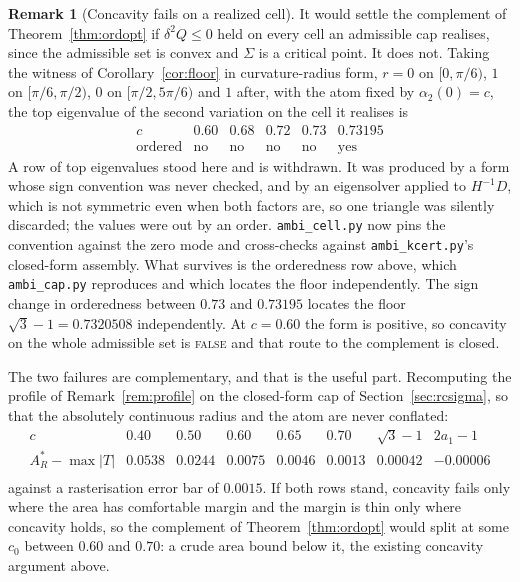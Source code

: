 \documentclass[11pt]{article}
\theoremstyle{definition}
\newtheorem{remark}[theorem]{Remark}
\newcommand{\Sig}{\Sigma}
\begin{document}
\begin{remark}[Concavity fails on a realized cell]\label{rem:concfail}
It would settle the complement of Theorem~\ref{thm:ordopt} if $\delta^2Q\le0$ held on every
cell an admissible cap realises, since the admissible set is convex and $\Sig$ is a critical
point. It does not. Taking the witness of Corollary~\ref{cor:floor} in curvature-radius
form, $r=0$ on $[0,\pi/6)$, $1$ on $[\pi/6,\pi/2)$, $0$ on $[\pi/2,5\pi/6)$ and $1$ after,
with the atom fixed by $\alpha_2(0)=c$, the top eigenvalue of the second variation on the
cell it realises is
\[
  \begin{array}{r|ccccc}
    c & 0.60 & 0.68 & 0.72 & 0.73 & 0.73195\\\hline
    \text{ordered} & \text{no} & \text{no} & \text{no} & \text{no} & \text{yes}
  \end{array}
\]
A row of top eigenvalues stood here and is withdrawn. It was produced by a form whose sign
convention was never checked, and by an eigensolver applied to $H^{-1}D$, which is not
symmetric even when both factors are, so one triangle was silently discarded; the values
were out by an order. \texttt{ambi\_cell.py} now pins the convention against the zero mode
and cross-checks against \texttt{ambi\_kcert.py}'s closed-form assembly. What survives is
the orderedness row above, which \texttt{ambi\_cap.py} reproduces and which locates the
floor independently.
The sign change in orderedness between $0.73$ and $0.73195$ locates the floor
$\sqrt3-1=0.7320508$ independently. At $c=0.60$ the form is positive, so concavity on the
whole admissible set is \textsc{false} and that route to the complement is closed.

The two failures are complementary, and that is the useful part. Recomputing the profile of
Remark~\ref{rem:profile} on the closed-form cap of Section~\ref{sec:rcsigma}, so that the
absolutely continuous radius and the atom are never conflated:
\[
  \begin{array}{r|ccccccc}
    c & 0.40 & 0.50 & 0.60 & 0.65 & 0.70 & \sqrt3-1 & 2a_1-1\\\hline
    A_R^\ast-\max|T| & 0.0538 & 0.0244 & 0.0075 & 0.0046 & 0.0013 & 0.00042 & -0.00006\\

  \end{array}
\]
against a rasterisation error bar of $0.0015$. If both rows stand, concavity fails only
where the area has comfortable margin and the margin is thin only where concavity holds, so
the complement of Theorem~\ref{thm:ordopt} would split at some $c_0$ between $0.60$ and
$0.70$: a crude area bound below it, the existing concavity argument above.


\end{remark}
\end{document}
